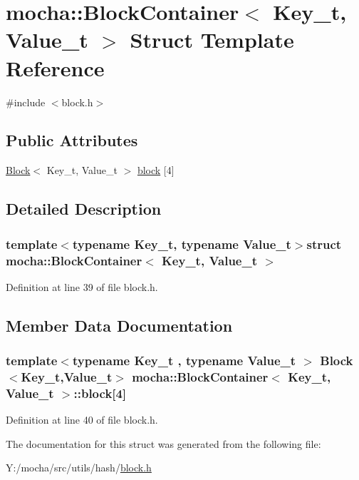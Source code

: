 \hypertarget{structmocha_1_1_block_container}{
\section{mocha::BlockContainer$<$ Key\_\-t, Value\_\-t $>$ Struct Template Reference}
\label{structmocha_1_1_block_container}
}


{\ttfamily \#include $<$block.h$>$}

\subsection*{Public Attributes}
\begin{DoxyCompactItemize}
\item 
\hyperlink{classmocha_1_1_block}{Block}$<$ Key\_\-t, Value\_\-t $>$ \hyperlink{structmocha_1_1_block_container_a66d8b2e380c4fd0032730260ac1cdb78}{block} \mbox{[}4\mbox{]}
\end{DoxyCompactItemize}


\subsection{Detailed Description}
\subsubsection*{template$<$typename Key\_\-t, typename Value\_\-t$>$struct mocha::BlockContainer$<$ Key\_\-t, Value\_\-t $>$}



Definition at line 39 of file block.h.



\subsection{Member Data Documentation}
\hypertarget{structmocha_1_1_block_container_a66d8b2e380c4fd0032730260ac1cdb78}{
\subsubsection[{block}]{\setlength{\rightskip}{0pt plus 5cm}template$<$typename Key\_\-t , typename Value\_\-t $>$ {\bf Block}$<$Key\_\-t,Value\_\-t$>$ {\bf mocha::BlockContainer}$<$ Key\_\-t, Value\_\-t $>$::{\bf block}\mbox{[}4\mbox{]}}}
\label{structmocha_1_1_block_container_a66d8b2e380c4fd0032730260ac1cdb78}


Definition at line 40 of file block.h.



The documentation for this struct was generated from the following file:\begin{DoxyCompactItemize}
\item 
Y:/mocha/src/utils/hash/\hyperlink{block_8h}{block.h}\end{DoxyCompactItemize}
